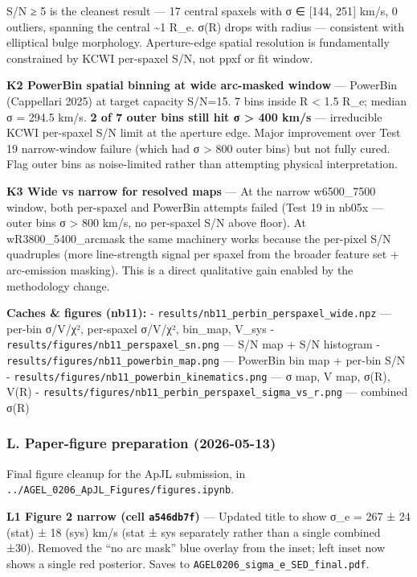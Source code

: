 \documentclass[
  10pt,
]{article}
\begin{document}
S/N ≥ 5 is the cleanest result --- 17 central spaxels with σ ∈ {[}144, 251{]} km/s, 0 outliers, spanning the central \textasciitilde1 R\_e. σ(R) drops with radius --- consistent with elliptical bulge
morphology. Aperture-edge spatial resolution is fundamentally constrained by KCWI per-spaxel S/N, not ppxf or fit window.

\textbf{K2 PowerBin spatial binning at wide arc-masked window} --- PowerBin (Cappellari 2025) at target capacity S/N=15. 7 bins inside R \textless{} 1.5 R\_e; median σ = 294.5 km/s. \textbf{2 of 7
outer bins still hit σ \textgreater{} 400 km/s} --- irreducible KCWI per-spaxel S/N limit at the aperture edge. Major improvement over Test 19 narrow-window failure (which had σ \textgreater{} 800
outer bins) but not fully cured. Flag outer bins as noise-limited rather than attempting physical interpretation.

\textbf{K3 Wide vs narrow for resolved maps} --- At the narrow w6500\_7500 window, both per-spaxel and PowerBin attempts failed (Test 19 in nb05x --- outer bins σ \textgreater{} 800 km/s, no
per-spaxel S/N above floor). At wR3800\_5400\_arcmask the same machinery works because the per-pixel S/N quadruples (more line-strength signal per spaxel from the broader feature set + arc-emission
masking). This is a direct qualitative gain enabled by the methodology change.

\textbf{Caches \& figures (nb11):} - \texttt{results/nb11\_perbin\_perspaxel\_wide.npz} --- per-bin σ/V/χ², per-spaxel σ/V/χ², bin\_map, V\_sys - \texttt{results/figures/nb11\_perspaxel\_sn.png} ---
S/N map + S/N histogram - \texttt{results/figures/nb11\_powerbin\_map.png} --- PowerBin bin map + per-bin S/N - \texttt{results/figures/nb11\_powerbin\_kinematics.png} --- σ map, V map, σ(R), V(R) -
\texttt{results/figures/nb11\_perbin\_perspaxel\_sigma\_vs\_r.png} --- combined σ(R)

\hypertarget{l.-paper-figure-preparation-2026-05-13}{%
\subsubsection{L. Paper-figure preparation (2026-05-13)}\label{l.-paper-figure-preparation-2026-05-13}}

Final figure cleanup for the ApJL submission, in \texttt{../AGEL\_0206\_ApJL\_Figures/figures.ipynb}.

\textbf{L1 Figure 2 narrow (cell \texttt{a546db7f})} --- Updated title to show σ\_e = 267 ± 24 (stat) ± 18 (sys) km/s (stat ± sys separately rather than a single combined ±30). Removed the ``no arc
mask'' blue overlay from the inset; left inset now shows a single red posterior. Saves to \texttt{AGEL0206\_sigma\_e\_SED\_final.pdf}.
\end{document}

